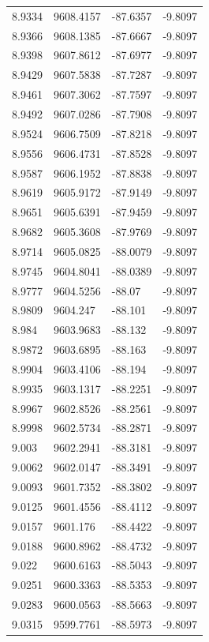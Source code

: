 \begin{table}[H]
\begin{tabular}{llll}
8.9334 & 9608.4157 & -87.6357 & -9.8097 \\
8.9366 & 9608.1385 & -87.6667 & -9.8097 \\
8.9398 & 9607.8612 & -87.6977 & -9.8097 \\
8.9429 & 9607.5838 & -87.7287 & -9.8097 \\
8.9461 & 9607.3062 & -87.7597 & -9.8097 \\
8.9492 & 9607.0286 & -87.7908 & -9.8097 \\
8.9524 & 9606.7509 & -87.8218 & -9.8097 \\
8.9556 & 9606.4731 & -87.8528 & -9.8097 \\
8.9587 & 9606.1952 & -87.8838 & -9.8097 \\
8.9619 & 9605.9172 & -87.9149 & -9.8097 \\
8.9651 & 9605.6391 & -87.9459 & -9.8097 \\
8.9682 & 9605.3608 & -87.9769 & -9.8097 \\
8.9714 & 9605.0825 & -88.0079 & -9.8097 \\
8.9745 & 9604.8041 & -88.0389 & -9.8097 \\
8.9777 & 9604.5256 & -88.07 & -9.8097 \\
8.9809 & 9604.247 & -88.101 & -9.8097 \\
8.984 & 9603.9683 & -88.132 & -9.8097 \\
8.9872 & 9603.6895 & -88.163 & -9.8097 \\
8.9904 & 9603.4106 & -88.194 & -9.8097 \\
8.9935 & 9603.1317 & -88.2251 & -9.8097 \\
8.9967 & 9602.8526 & -88.2561 & -9.8097 \\
8.9998 & 9602.5734 & -88.2871 & -9.8097 \\
9.003 & 9602.2941 & -88.3181 & -9.8097 \\
9.0062 & 9602.0147 & -88.3491 & -9.8097 \\
9.0093 & 9601.7352 & -88.3802 & -9.8097 \\
9.0125 & 9601.4556 & -88.4112 & -9.8097 \\
9.0157 & 9601.176 & -88.4422 & -9.8097 \\
9.0188 & 9600.8962 & -88.4732 & -9.8097 \\
9.022 & 9600.6163 & -88.5043 & -9.8097 \\
9.0251 & 9600.3363 & -88.5353 & -9.8097 \\
9.0283 & 9600.0563 & -88.5663 & -9.8097 \\
9.0315 & 9599.7761 & -88.5973 & -9.8097 \\

\end{tabular}
\end{table}
